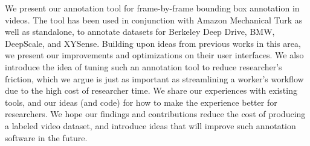 We present our annotation tool for frame-by-frame bounding box annotation in videos.
The tool has been used in conjunction with Amazon Mechanical Turk as well as standalone, to annotate datasets for Berkeley Deep Drive, BMW, DeepScale, and XYSense.
Building upon ideas from previous works in this area, we present our improvements and optimizations on their user interfaces.
We also introduce the idea of tuning such an annotation tool to reduce researcher's friction, which we argue is just as important as streamlining a worker's workflow due to the high cost of researcher time.
We share our experiences with existing tools, and our ideas (and code) for how to make the experience better for researchers.
We hope our findings and contributions reduce the cost of producing a labeled video dataset, and introduce ideas that will improve such annotation software in the future.
